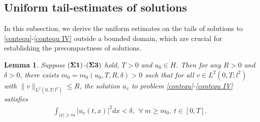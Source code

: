 \documentclass[11pt]{article}
\numberwithin{equation}{section}
\theoremstyle{plain}
\newtheorem{lemma}{Lemma}[section]
\def\geq{\geqslant}
\def\leq{\leqslant}
\begin{document}
\subsection{Uniform tail-estimates of solutions}

 In this subsection,
 we   derive the uniform estimates
 on  the tails of solutions to \eqref{contequ}-\eqref{contequ IV} outside a bounded domain,
 which are crucial for establishing the precompactness of solutions.

\begin{lemma} \label{tailestim}
  Suppose   $({\bf \Sigma 1})$-$({\bf \Sigma 3})$ hold,
  $T>0$  and $ u_0 \in H$.
  Then for any $R > 0$ and $\delta > 0$, there exists $m_0 = m_0(u_0, T, R, \delta) > 0$ such that
  for all $v \in L^2(0, T; l^2)$ with $\| v \|_{L^2(0, T; l^2)} \leq R$,
  the solution $u_v$ to problem \eqref{contequ}-\eqref{contequ IV}
  satisfies
  \begin{align*}
      \int_{|x| \geq m} |u_v(t,x)|^2 dx < \delta,
        \ \ \forall\  m \geq m_0, \   t \in [0,T].
  \end{align*}
\end{lemma}
\end{document}
